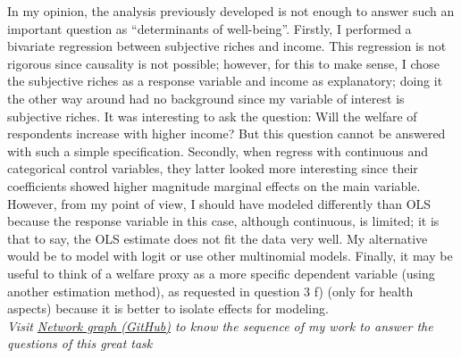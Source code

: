 \documentclass[12pt,a4paper]{article}
\begin{document}
	In my opinion, the analysis previously developed is not enough to answer such an important question as “determinants of well-being”.
	Firstly, I performed a bivariate regression between subjective riches and income. This regression is not rigorous since causality is not possible; however, for this to make sense, I chose the subjective riches as a response variable and income as explanatory; doing it the other way around had no background since my variable of interest is subjective riches. It was interesting to ask the question: Will the welfare of respondents increase with higher income? But this question cannot be answered with such a simple specification.
	Secondly, when regress with continuous and categorical control variables, they latter looked more interesting since their coefficients showed higher magnitude marginal effects on the main variable. However, from my point of view, I should have modeled differently than OLS because the response variable in this case, although continuous, is limited; it is that to say, the OLS estimate does not fit the data very well. My alternative would be to model with logit or use other multinomial models.
	Finally, it may be useful to think of a welfare proxy as a more specific dependent variable (using another estimation method), as requested in question 3 f) (only for health aspects) because it is better to isolate effects for modeling.\\[0.8 cm]

	
	\textit{Visit \href{"https://github.com/JasonCruz18/Subjective_Well-Being_Data_Task-BID-Columbia/network" }{Network graph (GitHub)} to know the sequence of my work to answer the questions of this great task}
	
\end{document}
